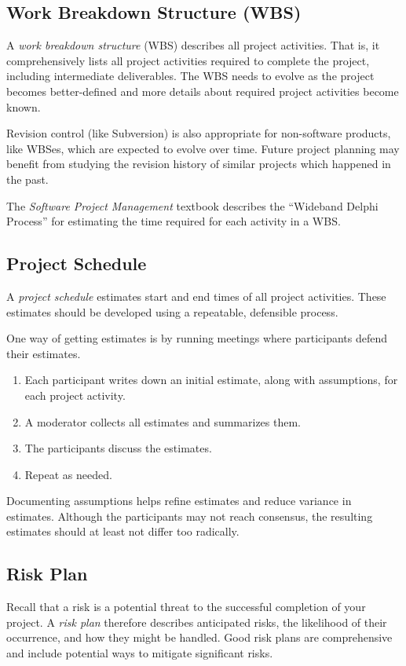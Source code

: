 \subsection*{Work Breakdown Structure (WBS)}
A \emph{work breakdown structure} (WBS) describes all project
activities.  That is, it comprehensively lists all project activities
required to complete the project, including intermediate deliverables.
The WBS needs to evolve as the project becomes better-defined and more
details about required project activities become known.

Revision control (like Subversion) is also appropriate for
non-software products, like WBSes, which are expected to evolve over
time. Future project planning may benefit from studying the revision
history of similar projects which happened in the past.

The \emph{Software Project Management} textbook describes the
``Wideband Delphi Process'' for estimating the time required for each
activity in a WBS.

\subsection*{Project Schedule}
A \emph{project schedule} estimates start and end times of all project
activities. These estimates should be developed using a repeatable,
defensible process.

One way of getting estimates is by running meetings where participants
defend their estimates.
\begin{enumerate}
\item Each participant writes down an initial estimate, along with assumptions,
for each project activity.
\item A moderator collects all estimates and summarizes them.
\item The participants discuss the estimates.
\item Repeat as needed.
\end{enumerate}

Documenting assumptions helps refine estimates and reduce variance in
estimates. Although the participants may not reach consensus, the resulting
estimates should at least not differ too radically.

\subsection*{Risk Plan}
Recall that a risk is a potential threat to the successful completion
of your project. A \emph{risk plan} therefore describes anticipated
risks, the likelihood of their occurrence, and how they might be
handled. Good risk plans are comprehensive and include potential ways
to mitigate significant risks.

